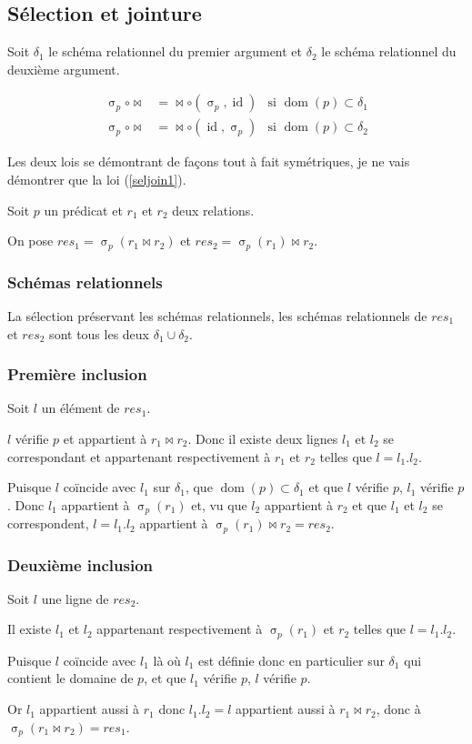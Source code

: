 \documentclass[french]{article}
\DeclareMathOperator{\sel}{\sigma}
\DeclareMathOperator{\id}{id}
\DeclareMathOperator{\dom}{dom}
\newcommand{\selP}{\sel_p}
\begin{document}
\subsection*{Sélection et jointure}
Soit $\delta_1$ le schéma relationnel du premier
argument et $\delta_2$ le schéma relationnel du deuxième
argument.

\begin{align}
\selP \circ \Join
& = \Join \circ (\selP, \id)
& \text{si $\dom(p) \subset \delta_1$}
\label{seljoin1}\\ 
\selP \circ \Join
& = \Join \circ (\id, \selP)
& \text{si $\dom(p) \subset \delta_2$}
\end{align}

Les deux lois se démontrant de façons tout à fait 
symétriques, je ne vais démontrer que la loi (\ref{seljoin1}).

Soit $p$ un prédicat et $r_1$ et $r_2$ deux relations.

On pose $res_1 = \selP(r_1 \Join r_2)$ et
$res_2 = \selP(r_1) \Join r_2$.

\subsubsection*{Schémas relationnels}
La sélection préservant les schémas relationnels,
les schémas relationnels de $res_1$ et $res_2$
sont tous les deux $\delta_1 \cup \delta_2$.

\subsubsection*{Première inclusion}
Soit $l$ un élément de $res_1$.

$l$ vérifie $p$ et appartient à $r_1 \Join r_2$.
Donc il existe deux lignes $l_1$ et $l_2$
se correspondant et appartenant respectivement
à $r_1$ et $r_2$ telles que $l= l_1 . l_2$.

Puisque $l$ coïncide avec $l_1$ sur $\delta_1$,
que $\dom(p) \subset \delta_1$ et que $l$ vérifie $p$,
$l_1$ vérifie $p$. Donc $l_1$ appartient à $\selP(r_1)$
et, vu que $l_2$ appartient à $r_2$ et que $l_1$ et $l_2$
se correspondent, $l = l_1. l_2$ appartient à $\selP(r_1) \Join r_2 = res_2$.

\subsubsection*{Deuxième inclusion}
Soit $l$ une ligne de $res_2$.

Il existe $l_1$ et $l_2$ appartenant respectivement à
$\selP(r_1)$ et $r_2$ telles que
$l = l_1 . l_2 $.

Puisque $l$ coïncide avec $l_1$ là où $l_1$ est définie
donc en particulier sur $\delta_1$ qui contient le domaine de $p$,
et que $l_1$ vérifie $p$, $l$ vérifie $p$.

Or $l_1$ appartient aussi à $r_1$ donc $l_1 . l_2 = l$
appartient aussi à $r_1 \Join r_2$, donc à $\selP(r_1 \Join r_2) = res_1$.
\end{document}
